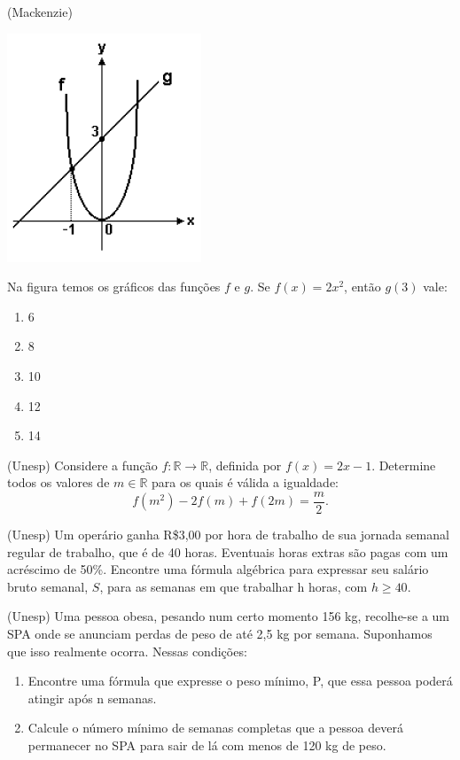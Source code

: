 				\item (Mackenzie)
				
				\begin{center}
				\includegraphics[scale=0.7]{figuras/fig25.png}
				\end{center}
				
				Na figura temos os gráficos das funções $f$ e $g$. Se $f(x)=2x^2$, então $g(3)$ vale:
				\begin{multicols}{5}
				\begin{enumerate}
					\item 6
					\item 8
					\item 10
					\item 12
					\item 14
				\end{enumerate}
				\end{multicols}
				
				\item (Unesp) Considere a função $f:\mathbb{R} \longrightarrow \mathbb{R}$, definida por $f(x)=2x-1$. Determine todos os valores de $m \in \mathbb{R}$ para os quais é válida a igualdade: $$f(m^2)-2f(m)+f(2m)= \displaystyle\frac{m}{2}.$$
				
			    \item (Unesp) Um operário ganha R\$3,00 por hora de trabalho de sua jornada semanal regular de trabalho, que é de 40 horas. Eventuais horas extras são pagas com um acréscimo de 50\%. Encontre uma fórmula algébrica para expressar seu salário bruto semanal, $S$, para as semanas em que trabalhar h horas, com $h\geqslant40$.	
			    
			    \item (Unesp) Uma pessoa obesa, pesando num certo momento 156 kg, recolhe-se a um SPA onde se anunciam perdas de peso de até 2,5 kg por semana. Suponhamos que isso realmente ocorra. Nessas condições:
			    	\begin{enumerate}
			    		\item Encontre uma fórmula que expresse o peso mínimo, P, que essa pessoa poderá atingir após n semanas.
			    		\item Calcule o número mínimo de semanas completas que a pessoa deverá permanecer no SPA para sair de lá com menos de 120 kg de peso.
			    	\end{enumerate}
			
